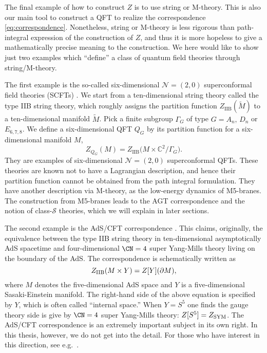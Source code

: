 The final example of how to construct $Z$ is to use string or M-theory. This
is also our main tool to construct a QFT to realize the correspondence
\eqref{eq:correspondence}. Nonetheless, string or M-theory
is less rigorous than path-integral expression of the construction
of $Z$, and thus it is more hopeless to give a mathematically precise
meaning to the construction. We here would like to show just two examples
which ``define'' a class of quantum field theories through string/M-theory.


The first example is the so-called six-dimensional $\mathcal{N}=(2,0)$
superconformal field theories (SCFTs) \cite{Witten:1995zh}.
We start from a ten-dimensional string theory called the
type IIB string theory, which roughly assigns the partition
function $Z_{\mathrm{IIB}}(\tilde{M})$ to a ten-dimensional
manifold $\tilde{M}$. Pick a finite subgroup $\Gamma_{G}$
of type $G=A_{n},\,D_{n}$ or $E_{6,7,8}$. We define a six-dimensional
QFT $Q_{G}$ by its partition function for a six-dimensional manifold
$M$,
\begin{equation}
Z_{Q_{G}}(M)  =  Z_{\mathrm{IIB}}\big(M\times\mathbb{C}^{2}/\Gamma_{G}\big).
\end{equation}
They are examples of six-dimensional $\mathcal{N}=(2,0)$
superconformal QFTs. These theories are known not to have a Lagrangian
description, and hence their partition function cannot be obtained from
the path integral formulation. They have another description via M-theory,
as the low-energy dynamics of M5-branes. The construction from M5-branes
leads to the AGT correspondence and the notion of class-$\mathcal{S}$
theories, which we will explain in later sections.


The second example is the AdS/CFT correspondence \cite{Maldacena:1997re,Gubser:1998bc,Witten:1998qj}.
This claims, originally, the equivalence between the type IIB string theory in ten-dimensional asymptotically
AdS spacetime and four-dimensional $\CN=4$ super Yang-Mills theory living on the boundary of the AdS.
The correspondence is schematically written as
\begin{equation}
  Z_{{\rm IIB}}(M\times Y) = Z[Y](\partial M),
\end{equation}
where $M$ denotes the five-dimensional AdS space and $Y$ is a five-dimensional Sasaki-Einstein manifold.
The right-hand side of the above equation is specified by $Y$, which is often called ``internal space.''
When $Y=S^5$ one finds the gauge theory side is give by $\CN=4$ super Yang-Mills theory:
$Z[S^5]=Z_{\rm SYM}$.
The AdS/CFT correspondence is an extremely important subject in its own right.
In this thesis, however, we do not get into the detail. For those who have interest in this direction,
see e.g.~\cite{Aharony:1999ti}.









